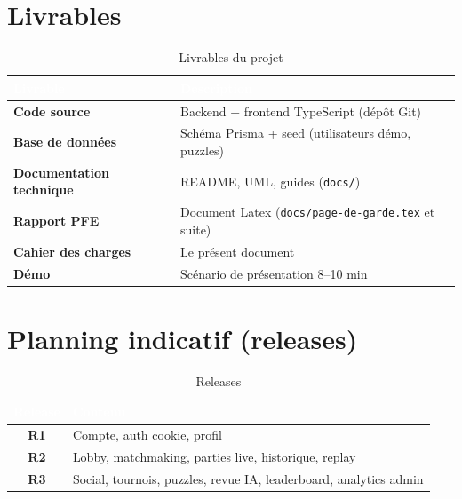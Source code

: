 \documentclass[12pt,a4paper,oneside]{article}
\begin{document}
\section{Livrables}

\begin{table}[H]
\centering
\caption{Livrables du projet}
\begin{tabularx}{\linewidth}{|>{\bfseries}l|X|}
\hline
\rowcolor{sectionblue}
\textcolor{white}{Livrable} & \textcolor{white}{\textbf{Description}} \\
\hline
Code source & Backend + frontend TypeScript (dépôt Git) \\
\hline
Base de données & Schéma Prisma + seed (utilisateurs démo, puzzles) \\
\hline
Documentation technique & README, UML, guides (\texttt{docs/}) \\
\hline
Rapport PFE & Document Latex (\texttt{docs/page-de-garde.tex} et suite) \\
\hline
Cahier des charges & Le présent document \\
\hline
Démo & Scénario de présentation 8--10 min \\
\hline
\end{tabularx}
\end{table}

\section{Planning indicatif (releases)}

\begin{table}[H]
\centering
\caption{Releases}
\begin{tabularx}{\linewidth}{|>{\bfseries}c|X|}
\hline
\rowcolor{sectionblue}
\textcolor{white}{Release} & \textcolor{white}{\textbf{Contenu}} \\
\hline
R1 & Compte, auth cookie, profil \\
\hline
R2 & Lobby, matchmaking, parties live, historique, replay \\
\hline
R3 & Social, tournois, puzzles, revue IA, leaderboard, analytics admin \\
\hline
\end{tabularx}
\end{table}
\end{document}
